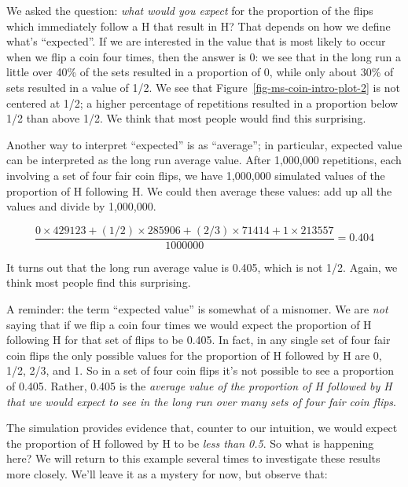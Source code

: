 \documentclass[
  letterpaper,
  DIV=11,
  numbers=noendperiod]{scrreprt}
\theoremstyle{plain}
\theoremstyle{definition}
\theoremstyle{definition}
\theoremstyle{definition}
\theoremstyle{remark}
\begin{document}
We asked the question: \emph{what would you expect} for the proportion
of the flips which immediately follow a H that result in H? That depends
on how we define what's ``expected''. If we are interested in the value
that is most likely to occur when we flip a coin four times, then the
answer is 0: we see that in the long run a little over 40\% of the sets
resulted in a proportion of 0, while only about 30\% of sets resulted in
a value of 1/2. We see that Figure~\ref{fig-ms-coin-intro-plot-2} is not
centered at 1/2; a higher percentage of repetitions resulted in a
proportion below 1/2 than above 1/2. We think that most people would
find this surprising.

Another way to interpret ``expected'' is as ``average''; in particular,
expected value can be interpreted as the long run average value. After
1,000,000 repetitions, each involving a set of four fair coin flips, we
have 1,000,000 simulated values of the proportion of H following H. We
could then average these values: add up all the values and divide by
1,000,000.

\[
{\scriptscriptstyle
\frac{0\times 429123 + (1/2)\times 285906 + (2/3) \times 71414 + 1 \times 213557}{1000000} = 0.404
}
\]

It turns out that the long run average value is 0.405, which is not 1/2.
Again, we think most people find this surprising.

A reminder: the term ``expected value'' is somewhat of a misnomer. We
are \emph{not} saying that if we flip a coin four times we would expect
the proportion of H following H for that set of flips to be 0.405. In
fact, in any single set of four fair coin flips the only possible values
for the proportion of H followed by H are 0, 1/2, 2/3, and 1. So in a
set of four coin flips it's not possible to see a proportion of 0.405.
Rather, 0.405 is the \emph{average value of the proportion of H followed
by H that we would expect to see in the long run over many sets of four
fair coin flips}.

The simulation provides evidence that, counter to our intuition, we
would expect the proportion of H followed by H to be \emph{less than
0.5}. So what is happening here? We will return to this example several
times to investigate these results more closely. We'll leave it as a
mystery for now, but observe that:
\end{document}
